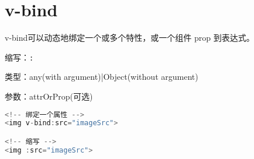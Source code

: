 \begin{lstlisting}[language=JavaScript]

\end{lstlisting}




\begin{lstlisting}[language=JavaScript]

\end{lstlisting}




\begin{lstlisting}[language=JavaScript]

\end{lstlisting}




\begin{lstlisting}[language=JavaScript]

\end{lstlisting}




\begin{lstlisting}[language=JavaScript]

\end{lstlisting}




\begin{lstlisting}[language=JavaScript]

\end{lstlisting}

\chapter{v-bind}

v-bind可以动态地绑定一个或多个特性，或一个组件 prop 到表达式。

\begin{compactitem}
\item 缩写：\texttt{:}
\item 类型：any(with argument)|Object(without argument)
\item 参数：attrOrProp(可选)
\end{compactitem}



\begin{lstlisting}[language=JavaScript]
<!-- 绑定一个属性 -->
<img v-bind:src="imageSrc">

<!-- 缩写 -->
<img :src="imageSrc">
\end{lstlisting}


